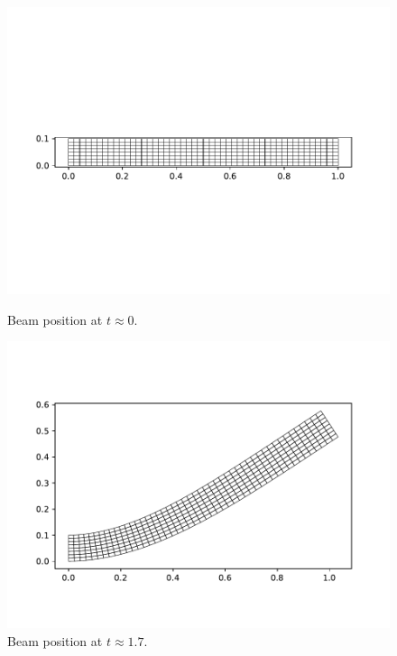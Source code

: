 \documentclass{report}
\begin{document}
\begin{figure}[h]
\centering
\begin{minipage}[t]{0.45\textwidth}
\centering
\includegraphics[width=\textwidth]{../Plots/Project3_main/Figure_1.pdf}
\caption{Beam position at $t\approx0$.}
\label{pl:beam_soln_initial}
\end{minipage}
\hfill
\begin{minipage}[t]{0.45\textwidth}
\centering
\includegraphics[width=\textwidth]{../Plots/Project3_main/Figure_8.pdf}
\caption{Beam position at $t\approx1.7$.}
\label{pl:beam_soln_position1}
\end{minipage}
\end{figure}
\end{document}

